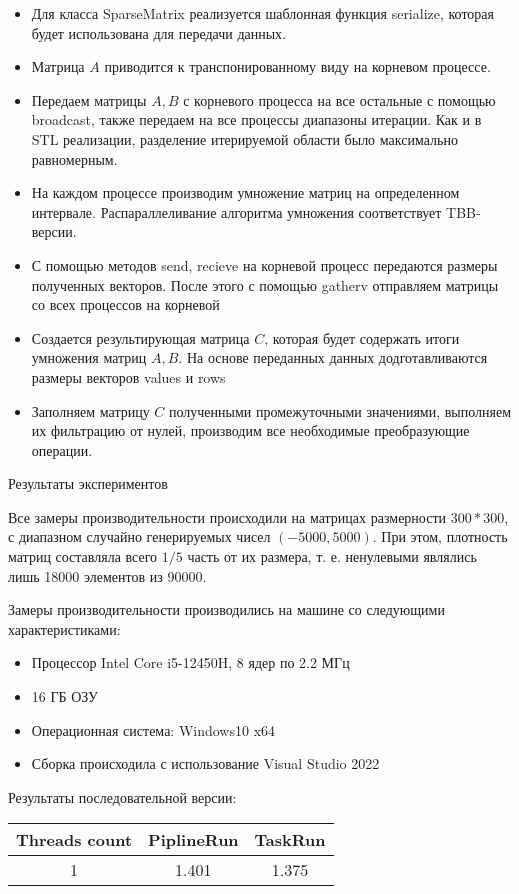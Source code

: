 \documentclass[12pt]{article}
\begin{document}
\begin{itemize}
    \item Для класса SparseMatrix реализуется шаблонная функция serialize, которая будет использована для передачи данных.  
    \item Матрица $A$ приводится к транспонированному виду на корневом процессе.
    \item Передаем матрицы $A, B$ с корневого процесса на все остальные с помощью broadcast, также передаем на все процессы диапазоны итерации. Как и в STL реализации, разделение итерируемой области было максимально равномерным.
    \item На каждом процессе производим умножение матриц на определенном интервале. Распараллеливание алгоритма умножения соответствует TBB-версии.
    \item С помощью методов send, recieve на корневой процесс передаются размеры полученных векторов. После этого с помощью gatherv отправляем матрицы со всех процессов на корневой
    \item Создается результирующая матрица $C$, которая будет содержать итоги умножения матриц $A, B$. На основе переданных данных додготавливаются размеры векторов values и rows 
    \item Заполняем матрицу $C$ полученными промежуточными значениями, выполняем их фильтрацию от нулей, производим все необходимые преобразующие операции.
\end{itemize}
\newpage
\begin{center}
\Large{Результаты экспериментов}
\end{center}

Все замеры производительности происходили на матрицах размерности $300*300$, с диапазном случайно генерируемых чисел $(-5000, 5000)$. При этом, плотность матриц составляла всего $1/5$ часть от их размера, т. е. ненулевыми являлись лишь 18000 элементов из 90000.

Замеры производительности производились на машине со следующими характеристиками:
\begin{itemize}
    \item Процессор Intel Core i5-12450H, 8 ядер по 2.2 МГц
    \item 16 ГБ ОЗУ
    \item Операционная система: Windows10 x64
    \item Сборка происходила с использование Visual Studio 2022
\end{itemize}

Результаты последовательной версии:
\begin{center}
    \begin{tabular}{|c|c|c|}
    \cline{1-3}
     Threads count & PiplineRun & TaskRun\\
       \hline
      1 & 1.401 & 1.375 \\
    \cline{1-3}
    \end{tabular}
\end{center}
\end{document}
